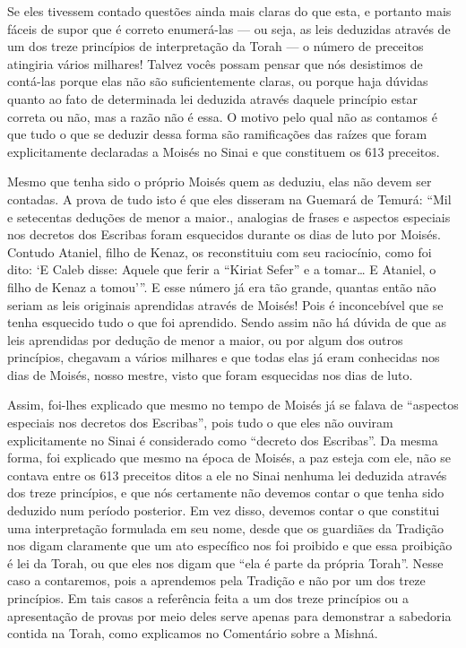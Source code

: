 Se eles tivessem contado questões ainda mais claras do que esta, e
portanto mais fáceis de supor que é correto enumerá-las --- ou seja, as
leis deduzidas através de um dos treze princípios de interpretação da
Torah --- o número de preceitos atingiria vários milhares! Talvez vocês
possam pensar que nós desistimos de contá-las porque elas não são
suficientemente claras, ou porque haja dúvidas quanto ao fato de
determinada lei deduzida através daquele princípio estar correta ou não,
mas a razão não é essa. O motivo pelo qual não as contamos é que tudo o
que se deduzir dessa forma são ramificações das raízes que foram
explicitamente declaradas a Moisés no Sinai e que constituem os 613
preceitos.

Mesmo que tenha sido o próprio Moisés quem as deduziu, elas não devem
ser contadas. A prova de tudo isto é que eles disseram na Guemará de
Temurá: ``Mil e setecentas deduções de menor a maior., analogias de
frases e aspectos especiais nos decretos dos Escribas foram esquecidos
durante os dias de luto por Moisés. Contudo Ataniel, filho de Kenaz, os
reconstituiu com seu raciocínio, como foi dito: `E Caleb disse: Aquele
que ferir a ``Kiriat Sefer'' e a tomar\ldots{} E Ataniel, o filho de Kenaz a
tomou'''. E esse número já era tão grande, quantas então não seriam as
leis originais aprendidas através de Moisés! Pois é inconcebível que se
tenha esquecido tudo o que foi aprendido. Sendo assim não há dúvida de
que as leis aprendidas por dedução de menor a maior, ou por algum dos
outros princípios, chegavam a vários milhares e que todas elas já eram
conhecidas nos dias de Moisés, nosso mestre, visto que foram esquecidas
nos dias de luto.

Assim, foi-lhes explicado que mesmo no tempo de Moisés já se falava de
``aspectos especiais nos decretos dos Escribas'', pois tudo o que eles
não ouviram explicitamente no Sinai é considerado como ``decreto dos
Escribas''. Da mesma forma, foi explicado que mesmo na época de Moisés,
a paz esteja com ele, não se contava entre os 613 preceitos ditos a ele
no Sinai nenhuma lei deduzida através dos treze princípios, e que nós
certamente não devemos contar o que tenha sido deduzido num período
posterior. Em vez disso, devemos contar o que constitui uma
interpretação formulada em seu nome, desde que os guardiães da Tradição
nos digam claramente que um ato específico nos foi proibido e que essa
proibição é lei da Torah, ou que eles nos digam que ``ela é parte da
própria Torah''. Nesse caso a contaremos, pois a aprendemos pela
Tradição e não por um dos treze princípios. Em tais casos a referência
feita a um dos treze princípios ou a apresentação de provas por meio
deles serve apenas para demonstrar a sabedoria contida na Torah, como
explicamos no Comentário sobre a Mishná.

